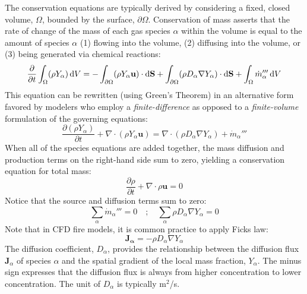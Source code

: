 \documentclass[graybox]{svmult}
\begin{document}
The conservation equations are typically derived by considering a fixed, closed volume, $\Omega$, bounded by the surface, $\partial \Omega$. Conservation of mass asserts that the rate of change of the mass of each gas species $\alpha$ within the volume is equal to the amount of species $\alpha$ (1) flowing into the volume, (2) diffusing into the volume, or (3) being generated via chemical reactions:
\begin{equation}
   \frac{ \partial }{\partial t} \int_\Omega  (\rho Y_\alpha) \, {\rm d}V = -\int_{\partial \Omega} (\rho Y_\alpha \mathbf{u}) \cdot {\rm d}{\mathbf S} + \int_{\partial \Omega} (\rho D_\alpha \nabla Y_\alpha) \cdot {\rm d}\mathbf{S} + \int_\Omega \dot{m}_\alpha''' \, {\rm d}V
   \label{eq:spec_con_vol}
\end{equation}
This equation can be rewritten (using Green's Theorem) in an alternative form favored by modelers who employ a {\em finite-difference} as opposed to a {\em finite-volume} formulation of the governing equations:
\begin{equation}
\frac{\partial (\rho Y_\alpha)}{\partial t} + \nabla \cdot (\rho Y_\alpha \mathbf{u}) = \nabla \cdot \left( \rho D_\alpha \nabla Y_\alpha \right) + \dot{m}_\alpha'''
\label{eq:speccon}
\end{equation}
When all of the species equations are added together, the mass diffusion and production terms on the right-hand side sum to zero, yielding a conservation equation for total mass:
\begin{equation}
\frac{\partial \rho}{\partial t} + \nabla \cdot \rho \mathbf{u} = 0
\label{eq:masscon}
\end{equation}
Notice that the source and diffusion terms sum to zero:
\begin{equation}
   \sum_\alpha  \dot{m}_\alpha''' = 0 \quad ; \quad \sum_\alpha \rho D_\alpha \nabla Y_\alpha = 0
\end{equation}
Note that in CFD fire models, it is common practice to apply Ficks law:
\begin{equation}
   \mathbf{J_\alpha} = -\rho D_\alpha \nabla Y_\alpha
\end{equation}
The diffusion coefficient, $D_\alpha$, provides the relationship between the diffusion flux $\mathbf{J}_\alpha$ of species $\alpha$ and the spatial gradient of the local mass fraction, $Y_\alpha$. The minus sign expresses that the diffusion flux is always from higher concentration to lower concentration. The unit of $D_\alpha$ is typically m$^2$/s.
\end{document}
